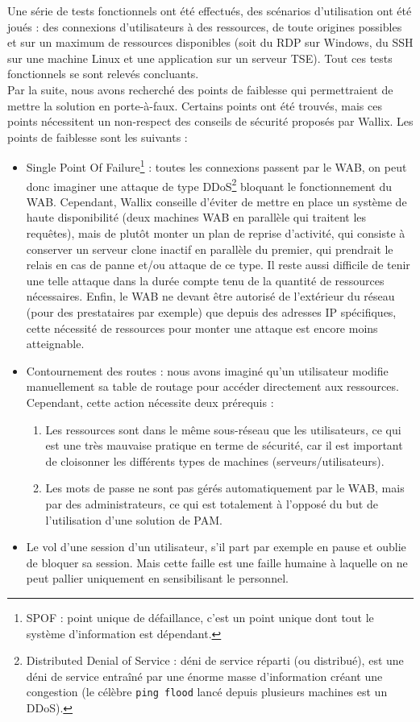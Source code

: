 Une série de tests fonctionnels ont été effectués, des scénarios d'utilisation ont été joués : des connexions d'utilisateurs à des ressources, de toute origines possibles et sur un maximum de ressources disponibles (soit du RDP sur Windows, du SSH sur une machine Linux et une application sur un serveur TSE). Tout ces tests fonctionnels se sont relevés concluants.\\
Par la suite, nous avons recherché des points de faiblesse qui permettraient de mettre la solution en porte-à-faux. Certains points ont été trouvés, mais ces points nécessitent un non-respect des conseils de sécurité proposés par Wallix. Les points de faiblesse sont les suivants :
\begin{itemize}
	\item Single Point Of Failure\footnote{SPOF : point unique de défaillance, c'est un point unique dont tout le système d'information est dépendant.} : toutes les connexions passent par le WAB, on peut donc imaginer une attaque de type DDoS\footnote{Distributed Denial of Service : déni de service réparti (ou distribué), est une déni de service entraîné par une énorme masse d'information créant une congestion (le célèbre \texttt{ping flood} lancé depuis plusieurs machines est un DDoS).} bloquant le fonctionnement du WAB. Cependant, Wallix conseille d'éviter de mettre en place un système de haute disponibilité (deux machines WAB en parallèle qui traitent les requêtes), mais de plutôt monter un plan de reprise d'activité, qui consiste à conserver un serveur clone inactif en parallèle du premier, qui prendrait le relais en cas de panne et/ou attaque de ce type. Il reste aussi difficile de tenir une telle attaque dans la durée compte tenu de la quantité de ressources nécessaires. Enfin, le WAB ne devant être autorisé de l'extérieur du réseau (pour des prestataires par exemple) que depuis des adresses IP spécifiques, cette nécessité de ressources pour monter une attaque est encore moins atteignable.
	\item Contournement des routes : nous avons imaginé qu'un utilisateur modifie manuellement sa table de routage pour accéder directement aux ressources. Cependant, cette action nécessite deux prérequis :
	\begin{enumerate}
		\item Les ressources sont dans le même sous-réseau que les utilisateurs, ce qui est une très mauvaise pratique en terme de sécurité, car il est important de cloisonner les différents types de machines (serveurs/utilisateurs).
		\item Les mots de passe ne sont pas gérés automatiquement par le WAB, mais par des administrateurs, ce qui est totalement à l'opposé du but de l'utilisation d'une solution de PAM.
	\end{enumerate}
	\item Le vol d'une session d'un utilisateur, s'il part par exemple en pause et oublie de bloquer sa session. Mais cette faille est une faille humaine à laquelle on ne peut pallier uniquement en sensibilisant le personnel.
\end{itemize}

